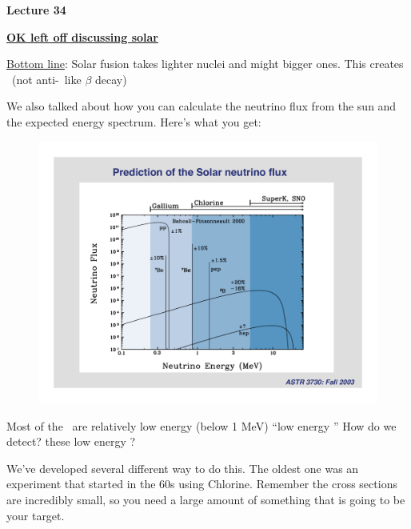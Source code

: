 



\thispagestyle{fancy}

\begin{center}
{\huge \textbf{Lecture 34}}
\end{center}

{\fontsize{14}{16}\selectfont

\textbf{\underline{OK left off discussing solar \nus}} 

\underline{Bottom line}: Solar fusion takes lighter nuclei and might bigger ones.  
This creates \nus\ (not anti-\nus\ like $\beta$ decay)

We also talked about how you can calculate the neutrino flux from the sun and the expected energy spectrum.
Here's what you get:

\begin{figure}[h!]
\centering
\includegraphics[width=1.0\textwidth]{./NuFromSun.pdf}
\end{figure}

Most of the \nus\ are relatively low energy (below 1 MeV) ``low energy \nus''
How do we detect? these low energy \nus ?

We've developed several different way to do this. 
The oldest one was an experiment that started in the 60s using Chlorine. 
Remember the cross sections are incredibly small, so you need a large amount of something that is going to be your target. 

}
